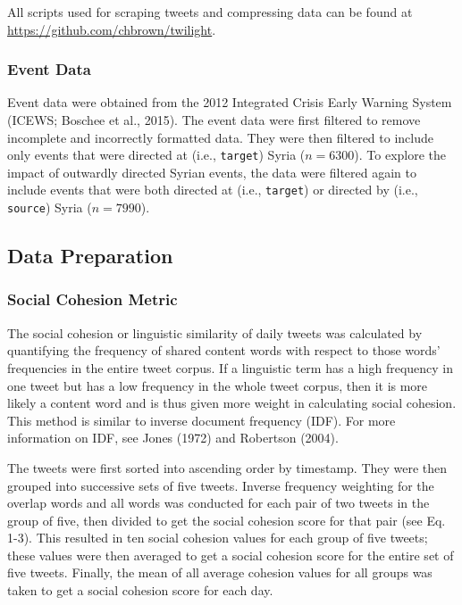 \documentclass[english,man]{apa6}
\begin{document}
All scripts used for scraping tweets and compressing data can be found at
\url{https://github.com/chbrown/twilight}.

\hypertarget{event-data}{%
\subsubsection{Event Data}\label{event-data}}

Event data were obtained from the 2012 Integrated Crisis Early Warning System
(ICEWS; Boschee et al., 2015). The event data were first filtered to remove
incomplete and incorrectly formatted data. They were then filtered to include
only events that were directed at (i.e., \texttt{target}) Syria (\(n = 6300\)). To
explore the impact of outwardly directed Syrian events, the data were filtered
again to include events that were both directed at (i.e., \texttt{target}) or directed
by (i.e., \texttt{source}) Syria (\(n = 7990\)).

\hypertarget{data-preparation}{%
\subsection{Data Preparation}\label{data-preparation}}

\hypertarget{social-cohesion-metric}{%
\subsubsection{Social Cohesion Metric}\label{social-cohesion-metric}}

The social cohesion or linguistic similarity of daily tweets was calculated by
quantifying the frequency of shared content words with respect to those words'
frequencies in the entire tweet corpus. If a linguistic term has a high
frequency in one tweet but has a low frequency in the whole tweet corpus, then
it is more likely a content word and is thus given more weight in calculating
social cohesion. This method is similar to inverse document frequency (IDF). For
more information on IDF, see Jones (1972) and
Robertson (2004).

The tweets were first sorted into ascending order by timestamp. They were then
grouped into successive sets of five tweets. Inverse frequency weighting for the
overlap words and all words was conducted for each pair of two tweets in the
group of five, then divided to get the social cohesion score for that pair (see
Eq. 1-3). This resulted in ten social cohesion values for each group of five
tweets; these values were then averaged to get a social cohesion score for the
entire set of five tweets. Finally, the mean of all average cohesion values for
all groups was taken to get a social cohesion score for each day.
\end{document}
